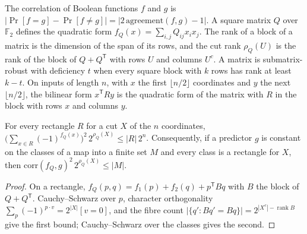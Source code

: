 \begin{definition}
  \label{def:lowerbounds-correlation-quadratic}
  \leanok
  The correlation of Boolean functions $f$ and $g$ is
  $|\Pr[f=g]-\Pr[f\ne g]|=|2\,\mathrm{agreement}(f,g)-1|$. A square matrix $Q$
  over $\mathbb{F}_2$ defines the quadratic form $f_Q(x)=\sum_{i,j}Q_{ij}x_ix_j$.
  The rank of a block of a matrix is the dimension of the span of its rows, and
  the cut rank $\rho_Q(U)$ is the rank of the block of $Q+Q^{\mathsf T}$ with rows
  $U$ and columns $U^c$. A matrix is submatrix-robust with deficiency $t$ when
  every square block with $k$ rows has rank at least $k-t$. On inputs of length
  $n$, with $x$ the first $\lfloor n/2\rfloor$ coordinates and $y$ the next
  $\lfloor n/2\rfloor$, the bilinear form $x^{\mathsf T}Ry$ is the quadratic form
  of the matrix with $R$ in the block with rows $x$ and columns $y$.
\end{definition}

\begin{lemma}
  \label{lem:lowerbounds-correlation-lindsey}
  \leanok
  For every rectangle $R$ for a cut $X$ of the $n$ coordinates,
  $\bigl(\sum_{x\in R}(-1)^{f_Q(x)}\bigr)^2\,2^{\rho_Q(X)}\le|R|\,2^n$.
  Consequently, if a predictor $g$ is constant on the classes of a map into a
  finite set $M$ and every class is a rectangle for $X$, then
  $\mathrm{corr}(f_Q,g)^2\,2^{\rho_Q(X)}\le|M|$.
\end{lemma}
\begin{proof}
  \leanok
  On a rectangle, $f_Q(p,q)=f_1(p)+f_2(q)+p^{\mathsf T}Bq$ with $B$ the block of
  $Q+Q^{\mathsf T}$. Cauchy--Schwarz over $p$, character orthogonality
  $\sum_p(-1)^{p\cdot v}=2^{|X|}[v=0]$, and the fibre count
  $|\{q':Bq'=Bq\}|=2^{|X^c|-\operatorname{rank}B}$ give the first bound;
  Cauchy--Schwarz over the classes gives the second.
\end{proof}

